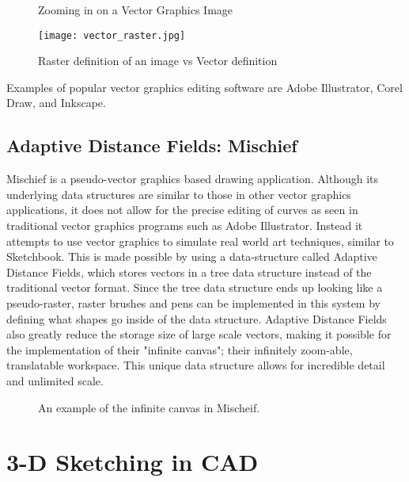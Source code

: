 \begin{figure}
\caption{Zooming in on a Vector Graphics Image \autocite{printingcollection}}
\end{figure}

\begin{figure}
\texttt{[image: vector\_raster.jpg]}
\caption{Raster definition of an image vs Vector definition}
\end{figure}

Examples of popular vector graphics editing software are Adobe Illustrator\autocite{illustrator}, Corel Draw\autocite{coreldraw}, and Inkscape\autocite{inkscape}.

\subsection{Adaptive Distance Fields: Mischief}

Mischief\autocite{mischief} is a pseudo-vector graphics based drawing application. 
Although its underlying data structures are similar to those in other vector graphics applications, it does not allow for the precise editing of curves as seen in traditional vector graphics programs such as Adobe Illustrator. 
Instead it attempts to use vector graphics to simulate real world art techniques, similar to Sketchbook.
This is made possible by using a data-structure called Adaptive Distance Fields\autocite{asdf}, which stores vectors in a tree data structure instead of the traditional vector format.
Since the tree data structure ends up looking like a pseudo-raster, raster brushes and pens can be implemented in this system by defining what shapes go inside of the data structure.
Adaptive Distance Fields also greatly reduce the storage size of large scale vectors, making it possible for the implementation of their "infinite canvas"; their infinitely zoom-able, translatable workspace. 
This unique data structure allows for incredible detail and unlimited scale.

\begin{figure}
\centering
{}
\caption{An example of the infinite canvas in Mischeif.}
\end{figure}

\section{3-D Sketching in CAD}

